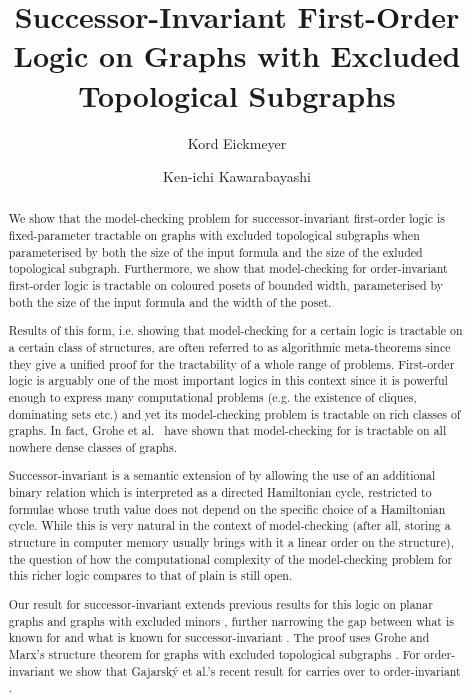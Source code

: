 \documentclass[12pt]{amsart}
\begin{document}
\title[succ-inv FO on Graphs with excl. top. subgraphs]{Successor-Invariant First-Order Logic on Graphs with Excluded
  Topological Subgraphs}
\author{Kord Eickmeyer}
\address{Technical University Darmstadt, Department of Mathematics, Schlossgartenstr. 7, 64289 Darmstadt, Germany}

\author{Ken-ichi Kawarabayashi}
\address{National Inst. of Informatics and JST, ERATO, Kawarabayashi Large Graph Project, Hitotsubashi 2-1-2, Tokyo 101-8430, Japan}





\let\realbfseries=\bfseries
\def\bfseries{\realbfseries\boldmath}





\begin{abstract}
  We show that the model-checking problem for successor-invariant
  first-order logic is fixed-parameter tractable on graphs with
  excluded topological subgraphs when parameterised by both the size
  of the input formula and the size of the exluded topological
  subgraph. Furthermore, we show that model-checking for
  order-invariant first-order logic is tractable on coloured posets of
  bounded width, parameterised by both the size of the input formula
  and the width of the poset.

  Results of this form, i.e. showing that model-checking for a certain
  logic is tractable on a certain class of structures, are often
  referred to as algorithmic meta-theorems since they give a unified
  proof for the tractability of a whole range of problems. First-order
  logic is arguably one of the most important logics in this context
  since it is powerful enough to express many computational problems
  (e.g. the existence of cliques, dominating sets etc.) and yet its
  model-checking problem is tractable on rich classes of graphs. In
  fact, Grohe et al.~\cite{gks14} have shown that model-checking for
   is tractable on all nowhere dense classes of graphs.

  Successor-invariant  is a semantic extension of  by allowing
  the use of an additional binary relation which is interpreted as a
  directed Hamiltonian cycle, restricted to formulae whose truth value
  does not depend on the specific choice of a Hamiltonian cycle. While
  this is very natural in the context of model-checking (after all,
  storing a structure in computer memory usually brings with it a
  linear order on the structure), the question of how the
  computational complexity of the model-checking problem for this
  richer logic compares to that of plain  is still open.

  Our result for successor-invariant  extends previous results
  for this logic on planar graphs \cite{EngelmannKS12} and graphs with
  excluded minors \cite{ekk13}, further narrowing the gap between what
  is known for  and what is known for successor-invariant
  . The proof uses Grohe and Marx's structure theorem for graphs
  with excluded topological subgraphs \cite{gromar12+}. For
  order-invariant  we show that Gajarský et al.'s recent result
  for  carries over to order-invariant .
\end{abstract}
\end{document}
